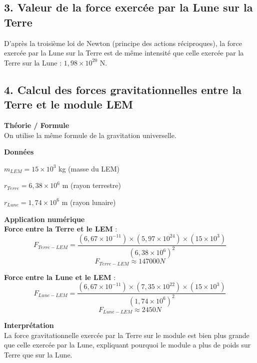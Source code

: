 \documentclass[a4paper,12pt]{article}
\begin{document}
\subsection*{3. Valeur de la force exercée par la Lune sur la Terre}
D’après la troisième loi de Newton (principe des actions réciproques), la force exercée par la Lune sur la Terre est de même intensité que celle exercée par la Terre sur la Lune : $1,98 \times 10^{20}$ N.

\subsection*{4. Calcul des forces gravitationnelles entre la Terre et le module LEM}
\begin{compactenum}
    \item \textbf{Théorie / Formule} \\
    On utilise la même formule de la gravitation universelle.

    \item \textbf{Données} \\
    \begin{compactenum}
        \item $m_{LEM} = 15 \times 10^3$ kg (masse du LEM)
        \item $r_{Terre} = 6,38 \times 10^6$ m (rayon terrestre)
        \item $r_{Lune} = 1,74 \times 10^6$ m (rayon lunaire)
    \end{compactenum}

    \item \textbf{Application numérique} \\
    \textbf{Force entre la Terre et le LEM} :
    \begin{equation}
        F_{Terre-LEM} = \frac{(6,67 \times 10^{-11}) \times (5,97 \times 10^{24}) \times (15 \times 10^3)}{(6,38 \times 10^6)^2}
    \end{equation}
    \begin{equation}
        F_{Terre-LEM} \approx 147000 N
    \end{equation}
    
    \textbf{Force entre la Lune et le LEM} :
    \begin{equation}
        F_{Lune-LEM} = \frac{(6,67 \times 10^{-11}) \times (7,35 \times 10^{22}) \times (15 \times 10^3)}{(1,74 \times 10^6)^2}
    \end{equation}
    \begin{equation}
        F_{Lune-LEM} \approx 2450 N
    \end{equation}

    \item \textbf{Interprétation} \\
    La force gravitationnelle exercée par la Terre sur le module est bien plus grande que celle exercée par la Lune, expliquant pourquoi le module a plus de poids sur Terre que sur la Lune.
\end{compactenum}
\end{document}
